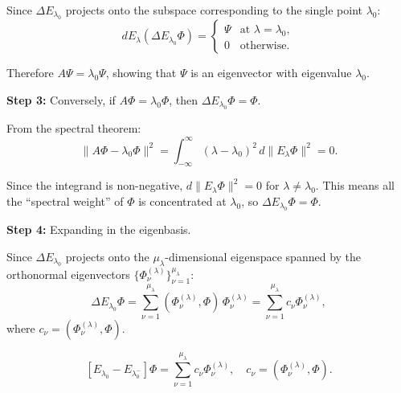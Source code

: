 \documentclass[12pt]{article}
\begin{document}
Since $\Delta E_{\lambda_0}$ projects onto the subspace corresponding to the single point $\lambda_0$:
\[
dE_\lambda(\Delta E_{\lambda_0}\Phi) = \begin{cases} \Psi & \text{at } \lambda = \lambda_0, \\ 0 & \text{otherwise}. \end{cases}
\]

Therefore $A\Psi = \lambda_0\Psi$, showing that $\Psi$ is an eigenvector with eigenvalue $\lambda_0$.

\textbf{Step 3:} Conversely, if $A\Phi = \lambda_0\Phi$, then $\Delta E_{\lambda_0}\Phi = \Phi$.

From the spectral theorem:
\[
\|A\Phi - \lambda_0\Phi\|^2 = \int_{-\infty}^{\infty}(\lambda - \lambda_0)^2\,d\|E_\lambda\Phi\|^2 = 0.
\]

Since the integrand is non-negative, $d\|E_\lambda\Phi\|^2 = 0$ for $\lambda \neq \lambda_0$. This means all the ``spectral weight'' of $\Phi$ is concentrated at $\lambda_0$, so $\Delta E_{\lambda_0}\Phi = \Phi$.

\textbf{Step 4:} Expanding in the eigenbasis.

Since $\Delta E_{\lambda_0}$ projects onto the $\mu_\lambda$-dimensional eigenspace spanned by the orthonormal eigenvectors $\{\Phi_\nu^{(\lambda)}\}_{\nu=1}^{\mu_\lambda}$:
\[
\Delta E_{\lambda_0}\Phi = \sum_{\nu=1}^{\mu_\lambda}(\Phi_\nu^{(\lambda)}, \Phi)\,\Phi_\nu^{(\lambda)} = \sum_{\nu=1}^{\mu_\lambda}c_\nu\Phi_\nu^{(\lambda)},
\]
where $c_\nu = (\Phi_\nu^{(\lambda)}, \Phi)$.

\[
\boxed{[E_{\lambda_0} - E_{\lambda_0^-}]\Phi = \sum_{\nu=1}^{\mu_\lambda}c_\nu\Phi_\nu^{(\lambda)}, \quad c_\nu = (\Phi_\nu^{(\lambda)}, \Phi).}
\]
\end{document}
